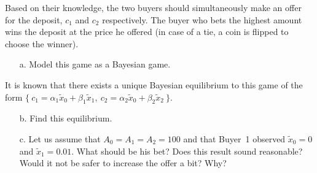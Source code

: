 \documentclass{../ape}
\begin{document}
Based on their knowledge, the two buyers should simultaneously make an offer for the deposit, $c_1$ and $c_2$ respectively. The buyer who bets the highest amount wins the deposit at the price he offered (in case of a tie, a coin is flipped to choose the winner).
\begin{enumerate}
	\item[a.] Model this game as a Bayesian game.
\end{enumerate}
It is known that there exists a unique Bayesian equilibrium to this game of the form $\{ \ c_1 = \alpha_1 \tilde{x}_0 + \beta_1 \tilde{x}_1, \ c_2 = \alpha_2 \tilde{x}_0 + \beta_2 \tilde{x}_2 \ \}$.
\begin{enumerate}
	\item[b.] Find this equilibrium.
	\item[c.] Let us assume that $A_0 = A_1 = A_2 = 100$ and that Buyer~1 observed $\tilde{x}_0 = 0$ and $\tilde{x}_1 = 0.01$. What should be his bet? Does this result sound reasonable? Would it not be safer to increase the offer a bit? Why?
\end{enumerate}
\end{document}
